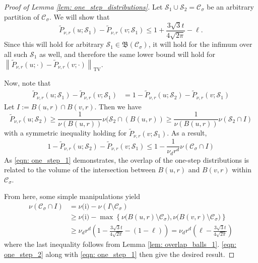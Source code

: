 \documentclass[11pt,twoside]{article}
\newcommand{\set}[1]{\left\{#1\right\}}
\newcommand{\norm}[1]{\left\lVert#1\right\rVert}
\newcommand{\1}{\mathbf{1}}
\newcommand{\Sset}{\mathcal{S}}
\newcommand{\Cset}{\mathcal{C}}
\newcommand{\Csig}{\Cset_{\sigma}}
\begin{document}
\begin{proof}[Proof of Lemma \ref{lem: one_step_distributions}]
	Let $\Sset_1 \cup \Sset_2 = \Csig$ be an arbitrary partition of $\Csig$. We will show that 
	\begin{equation*}
	\widetilde{P}_{\nu,r}(u; \Sset_1) - \widetilde{P}_{\nu,r}(v; \Sset_1) \leq 1 + \frac{3 \sqrt{3} t}{4\sqrt{2\pi}} - \ell.
	\end{equation*}
	Since this will hold for arbitrary $\Sset_1 \in \mathfrak{B}(\Csig)$, it will hold for the infimum over all such $\Sset_1$ as well, and therefore the same lower bound will hold for $\norm{\widetilde{P}_{\nu,r}(u; \cdot) - \widetilde{P}_{\nu,r}(v; \cdot)}_{\mathrm{TV}}$.
	
	Now, note that
	\begin{align*}
	\widetilde{P}_{\nu,r}(u; \Sset_1) - \widetilde{P}_{\nu,r}(v; \Sset_1) & = 1 - \widetilde{P}_{\nu,r}(u; \Sset_2) - \widetilde{P}_{\nu,r}(v; \Sset_1)
	\end{align*}
	Let $I := B(u,r) \cap B(v,r)$. Then we have
	\begin{equation*}
	\widetilde{P}_{\nu,r}(u; \Sset_2) \geq \frac{1}{\nu(B(u,r))} \nu(\Sset_2 \cap (B(u,r)) \geq \frac{1}{\nu(B(u,r))} \nu(\Sset_2 \cap I)
	\end{equation*}
	with a symmetric inequality holding for $\widetilde{P}_{\nu,r}(v; \Sset_1)$. As a result,
	\begin{equation}
	1 - \widetilde{P}_{\nu,r}(u; \Sset_2) - \widetilde{P}_{\nu,r}(v; \Sset_1) \leq 1 - \frac{1}{\nu_d r^d} \nu(\Csig \cap I) \label{eqn: one_step_1}
	\end{equation}
	As \eqref{eqn: one_step_1} demonstrates, the overlap of the one-step distributions is related to the volume of the intersection between $B(u,r)$ and $B(v,r)$ within $\Csig$.
	
	From here, some simple manipulations yield
	\begin{align}
	\nu(\Csig \cap I)  & = \nu\text{(i)} - \nu(I \setminus \Csig) \nonumber \\
	& \geq \nu\text{(i)} - \max \set{\nu\bigl(B(u,r) \setminus \Csig\bigr), \nu\bigl(B(v,r) \setminus \Csig\bigr)} \nonumber \\
	& \geq \nu_d r^d \left(1 - \frac{3 \sqrt{3} t}{4\sqrt{2\pi}} - (1 -\ell) \label{eqn: one_step_2} \right) = \nu_d r^d\left(\ell - \frac{3 \sqrt{3} t}{4\sqrt{2\pi}}\right)
	\end{align}
	where the last inequality follows from Lemma \ref{lem: overlap_balls_1}. \eqref{eqn: one_step_2} along with \eqref{eqn: one_step_1} then give the desired result.
\end{proof}
\end{document}
